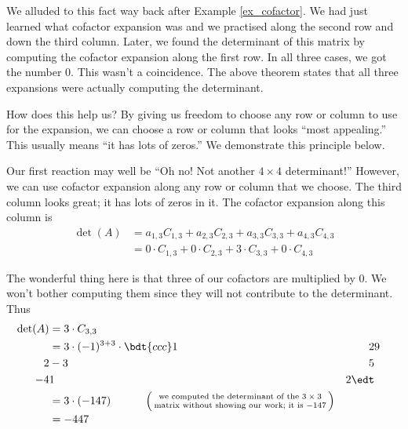 We alluded to this fact way back after Example \ref{ex_cofactor}. We had just learned what cofactor expansion was and we practised along the second row and down the third column. Later, we found the determinant of this matrix by computing the cofactor expansion along the first row. In all three cases, we got the number 0. This wasn't a coincidence. The above theorem states that all three expansions were actually computing the determinant.

How does this help us? By giving us freedom to choose any row or column to use for the expansion, we can choose a row or column that looks ``most appealing.'' This usually means ``it has lots of zeros.'' We demonstrate this principle below.

\medskip

{
Our first reaction may well be ``Oh no! Not another $4\times 4$ determinant!'' However, we can use cofactor expansion along any row or column that we choose. The third column looks great; it has lots of zeros in it. The cofactor expansion along this column is
\begin{align*}
\det(A) & = a_{1,3}C_{1,3} + a_{2,3}C_{2,3} + a_{3,3}C_{3,3}+a_{4,3}C_{4,3} \\
	&= 0\cdot C_{1,3} + 0\cdot C_{2,3} + 3\cdot C_{3,3} + 0\cdot C_{4,3}
\end{align*}

The wonderful thing here is that three of our cofactors are multiplied by 0. We won't bother computing them since they will not contribute to the determinant. Thus 
\begin{align*}
\det(A) & = 3\cdot C_{3,3} \\
& = 3\cdot (-1)^{3+3}\cdot \bdt{ccc}1&2&9\\2&-3&5\\-4&1&2\edt \\
&= 3\cdot(-147) \quad\quad\quad \left(\parbox{160pt}{\centering\scriptsize we computed the determinant of the $3\times 3$ matrix without showing our work; it is $-147$}\right)\\
&= -447
\end{align*}

}\\

\medskip

